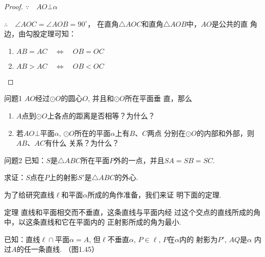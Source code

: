 \begin{figure}[htp]
  \centering
{}
  \caption{}
\end{figure}


\begin{proof}
$\because\quad AO\bot\alpha$

$\therefore \quad \angle AOC=\angle AOB=90^{\circ}$，
在直角$\triangle AOC$和直角$\triangle AOB$中，$AO$是公共的直
角边，由勾股定理可知：
\begin{enumerate}
  \item $AB=AC\quad \Longleftrightarrow \quad OB=OC$
  \item $AB>AC\quad \Longleftrightarrow \quad OB<OC$
\end{enumerate}
\end{proof}

\begin{blk}
  {问题1} $AO$经过$\odot O$的圆心$O$, 并且和$\odot O$所在平面垂
直，那么
\begin{enumerate}
  \item $A$点到$\odot O$上各点的距离是否相等？为什么？
  \item 若$AO\bot$平面$\alpha$, $\odot O$所在的平面$\alpha$上有$B$、$C$两点
分别在$\odot O$的内部和外部，则$AB$、$AC$有什么
关系？为什么？
\end{enumerate}
\end{blk}


\begin{blk}
  {问题2} 已知：$S$是$\triangle ABC$所在平面$P$外的一点，并且$SA
=SB=SC$.

求证：$S$点在$P$上的射影$S'$是$\triangle ABC$的外心. 
\end{blk}

为了给研究直线$\ell$和平面$\alpha$所成的角作准备，我们来证
明下面的定理. 

\begin{blk}
  {定理} 直线和平面相交而不垂直，这条直线与平面内经
过这个交点的直线所成的角中，以这条直线和它在平面内的
正射影所成的角为最小. 
\end{blk}

已知：直线$\ell\cap$平面$\alpha=A$, 但$\ell$不垂直$\alpha$, $P\in\ell$, $P$在$\alpha$内的
射影为$P'$, $AQ$是$\alpha$
内过$A$的任一条直线. （图1.45）

